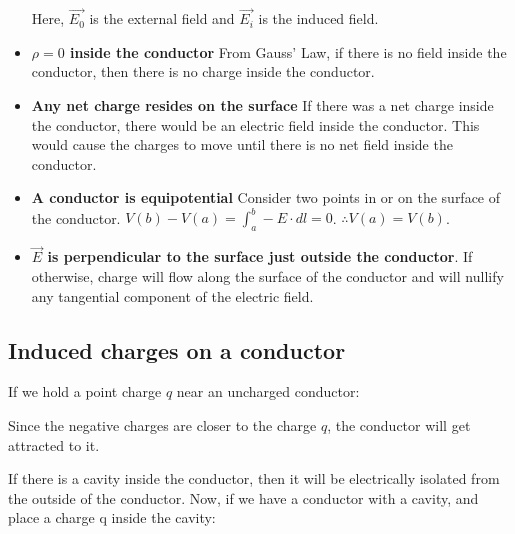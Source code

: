 \documentclass{article}
\begin{document}
\begin{itemize}
\begin{figure}[H]
	      \end{figure}
	      Here, $\vec{E_0}$ is the external field and $\vec{E_i}$ is the induced field.
	\item \textbf{$\rho = 0$ inside the conductor} From Gauss' Law, if there is no field inside the conductor, then there is no charge inside the conductor.
	\item \textbf{Any net charge resides on the surface} If there was a net charge inside the conductor, there would be an electric field inside the conductor. This would cause the charges to move until there is no net field inside the conductor.
	\item \textbf{A conductor is equipotential} Consider two points in or on the surface of the conductor. \(V(b) - V(a) = \int_{a}^{b}-E\cdot dl = 0\). \(\therefore V(a) = V(b)\).
	\item \textbf{$\vec{E}$ is perpendicular to the surface just outside the conductor}. If otherwise, charge will flow along the surface of the conductor and will nullify any tangential component of the electric field.
\end{itemize}

\subsection{Induced charges on a conductor}
If we hold a point charge $q$ near an uncharged conductor:


Since the negative charges are closer to the charge $q$, the conductor will get attracted to it.

If there is a cavity inside the conductor, then it will be electrically isolated from the outside of the conductor.
Now, if we have a conductor with a cavity, and place a charge q inside the cavity:
\end{document}
